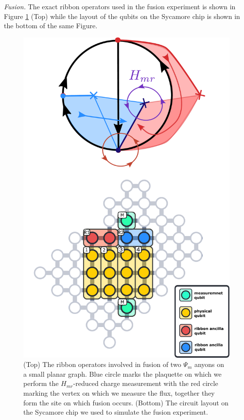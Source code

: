 \documentclass[two column]{article}
\begin{document}
\emph{Fusion.} The exact ribbon operators used in the fusion experiment is shown in Figure \ref{fig:fusion_setup} (Top) while the layout of the qubits on the Sycamore chip is shown in the bottom of the same Figure.
\begin{figure}
	\centering
	\includegraphics[width=\linewidth]{Figures/basket_fusion.pdf}
	\caption{(Top) The ribbon operators involved in fusion of two $\Psi_m$ anyons on a small planar graph. Blue circle marks the plaquette on which we perform the $H_{mr}$-reduced charge measurement with the red circle marking the vertex on which we measure the flux, together they form the site on which fusion occurs. (Bottom) The circuit layout on the Sycamore chip we used to simulate the fusion experiment.}
	\label{fig:fusion_setup}
\end{figure}
\end{document}
